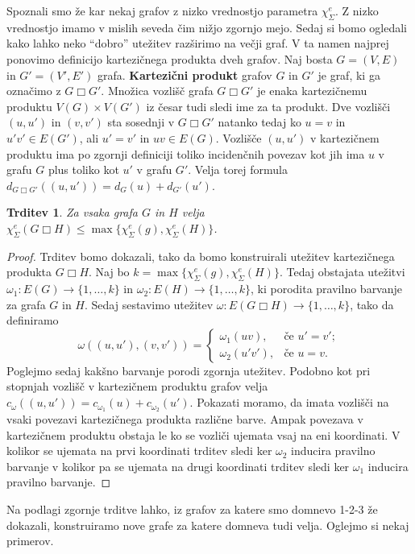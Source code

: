 \documentclass[12pt,a4paper,twoside]{article}
\theoremstyle{definition} %
\theoremstyle{plain} %
\newtheorem{trditev}[definicija]{Trditev}
\newcommand{\ec}{\chi_{\Sigma}^e}
\numberwithin{equation}{section}  %
\DeclareMathOperator{\cart}{\Box}
\begin{document}
Spoznali smo že kar nekaj grafov z nizko vrednostjo parametra $\ec$. Z nizko vrednostjo imamo v mislih seveda čim nižjo zgornjo mejo. Sedaj si bomo ogledali kako lahko neko ``dobro'' utežitev razširimo na večji graf. V ta namen najprej ponovimo definicijo kartezičnega produkta dveh grafov. Naj bosta $G =(V, E)$ in $G' = (V', E')$ grafa.  \textbf{Kartezični produkt} grafov $G$ in $G'$ je graf, ki ga označimo z $G \cart G'$. Množica vozlišč grafa  $G \cart G'$ je enaka kartezičnemu produktu $V(G) \times V(G')$ iz česar tudi sledi ime za ta produkt. Dve vozlišči $(u, u')$ in $(v, v')$ sta sosednji v $G  \cart G'$ natanko tedaj ko $u=v$ in $u'v' \in E(G')$, ali $u' = v'$ in $uv \in E(G)$. Vozlišče $(u, u')$ v kartezičnem produktu ima po zgornji definiciji toliko incidenčnih povezav kot jih ima $u$ v grafu $G$ plus toliko kot $u'$ v grafu $G'$. Velja torej formula $d_{G  \cart G'}((u, u')) = d_G(u) + d_{G'}(u')$.
\begin{trditev}
Za vsaka grafa $G$ in $H$ velja $\ec(G \Box H) \le \max \{\ec(g), \ec(H)\}$.
\end{trditev}
\begin{proof}
Trditev bomo dokazali, tako da bomo konstruirali utežitev kartezičnega produkta  $G \cart H$. Naj bo $k =\max \{\ec(g), \ec(H)\} $. Tedaj obstajata utežitvi $\omega_1 : E(G) \rightarrow \{1, \ldots, k\}$ in $\omega_2 : E(H)\rightarrow \{1, \ldots, k\}$, ki porodita pravilno barvanje za grafa $G$ in $H$. Sedaj sestavimo utežitev $\omega : E(G \cart H) \rightarrow \{1, \ldots, k\}$, tako da definiramo 
\begin{equation*}
\omega((u, u'), (v, v')) = \begin{cases}
	\omega_1(uv) ,& \text{če } u' = v';\\ 
	\omega_2(u'v'), &\text{če } u = v.
	\end{cases}
\end{equation*}
Poglejmo sedaj kakšno barvanje porodi zgornja utežitev. Podobno kot pri stopnjah vozlišč v kartezičnem produktu grafov velja $c_{\omega}((u, u')) = c_{\omega_1}(u) + c_{\omega_2}(u')$. Pokazati moramo, da imata vozlišči na vsaki povezavi kartezičnega produkta različne barve. Ampak povezava v kartezičnem produktu obstaja le ko se vozliči ujemata vsaj na eni koordinati. V kolikor se ujemata na prvi koordinati trditev sledi ker $\omega_2$ inducira pravilno barvanje v kolikor pa se ujemata na drugi koordinati trditev sledi ker $\omega_1$ inducira pravilno barvanje.
\end{proof}
Na podlagi zgornje trditve lahko, iz grafov za katere smo domnevo 1-2-3 že dokazali, konstruiramo nove grafe za katere domneva tudi velja. Oglejmo si nekaj primerov.
\end{document}
